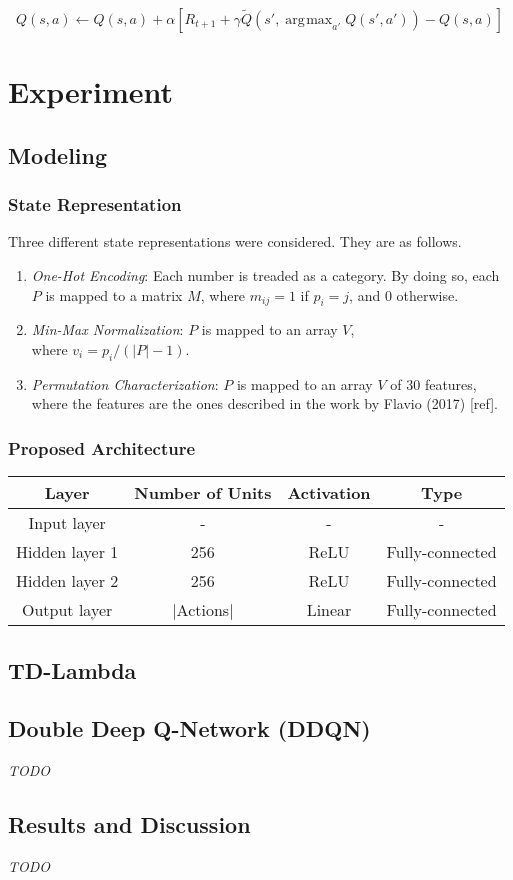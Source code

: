\documentclass[11pt,twoside]{article}
\DeclareMathOperator*{\argmax}{\arg\!\max}
\begin{document}
\begin{equation}
	Q(s, a) \leftarrow Q(s, a) + \alpha [R_{t+1} + \gamma \widetilde{Q}(s', \argmax_{a'}{Q(s', a')}) - Q(s,a)]
\end{equation}


\section{Experiment}

\subsection{Modeling}

\subsubsection{State Representation}

Three different state representations were considered. They are as follows.

\begin{enumerate}
	\item \textit{One-Hot Encoding}: Each number is treaded as a category. By doing so, each $P$ is mapped to a matrix $M$, where $m_{ij} = 1$ if $p_i = j$, and $0$ otherwise. 
	\item \textit{Min-Max Normalization}: $P$ is mapped to an array $V$,\\ where $v_i = p_i / (|P| - 1)$.
	\item \textit{Permutation Characterization}: $P$ is mapped to an array $V$ of $30$ features, where the features are the ones described in the work by Flavio (2017) [ref].
\end{enumerate}

\subsubsection{Proposed Architecture}

\begin{center}
 \begin{tabular}{|c c c c|} 
	\hline
	Layer & Number of Units & Activation & Type \\
	\hline\hline
	Input layer & - & - & - \\ 
	\hline
	Hidden layer 1 & 256 & ReLU & Fully-connected\\
	\hline
	Hidden layer 2 & 256 & ReLU & Fully-connected\\
	\hline
	Output layer & $|$Actions$|$ & Linear & Fully-connected \\
	\hline
\end{tabular}
\end{center}

\subsection{TD-Lambda}

\subsection{Double Deep Q-Network (DDQN)}

\textit{TODO}

\subsection{Results and Discussion}

\textit{TODO}



\end{document}
